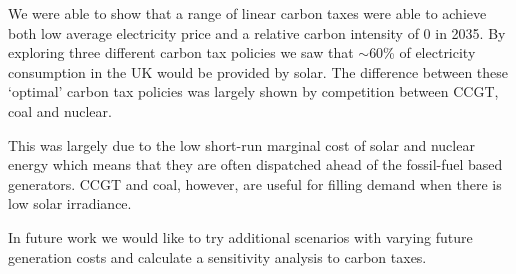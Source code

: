 \documentclass[sigconf]{acmart}
\begin{document}
We were able to show that a range of linear carbon taxes were able to achieve both low average electricity price and a relative carbon intensity of 0 in 2035. By exploring three different carbon tax policies we saw that ${\sim}$60\% of electricity consumption in the UK would be provided by solar. The difference between these `optimal' carbon tax policies was largely shown by competition between CCGT, coal and nuclear.

This was largely due to the low short-run marginal cost of solar and nuclear energy which means that they are often dispatched ahead of the fossil-fuel based generators. CCGT and coal, however, are useful for filling demand when there is low solar irradiance.

In future work we would like to try additional scenarios with varying future generation costs and calculate a sensitivity analysis to carbon taxes.







\appendix
\end{document}
